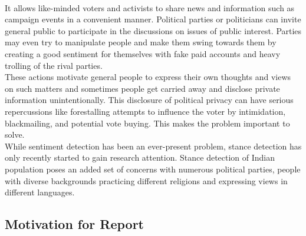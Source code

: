 \documentclass[a4paper,11pt]{article}
\begin{document}
\medskip\\
It allows like-minded voters and activists to share news and information such as campaign events in a convenient manner. Political parties or politicians can invite general public to participate in the discussions on issues of public interest. Parties may even try to manipulate people and make them swing towards them by creating a good sentiment for themselves with fake paid accounts and heavy trolling of the rival parties.
\medskip\\
These actions motivate general people to express their own thoughts and views on such matters and sometimes people get carried away and disclose private information unintentionally. This disclosure of political privacy can have serious repercussions like forestalling attempts to influence the voter by intimidation, blackmailing, and potential vote buying. This makes the problem important to solve.
\medskip\\
While sentiment detection has been an ever-present problem, stance detection has only recently started to gain research attention. Stance detection of Indian population poses an added set of concerns with numerous political parties, people with diverse backgrounds practicing different religions and expressing views in different languages.

\subsection{Motivation for Report}
\end{document}
